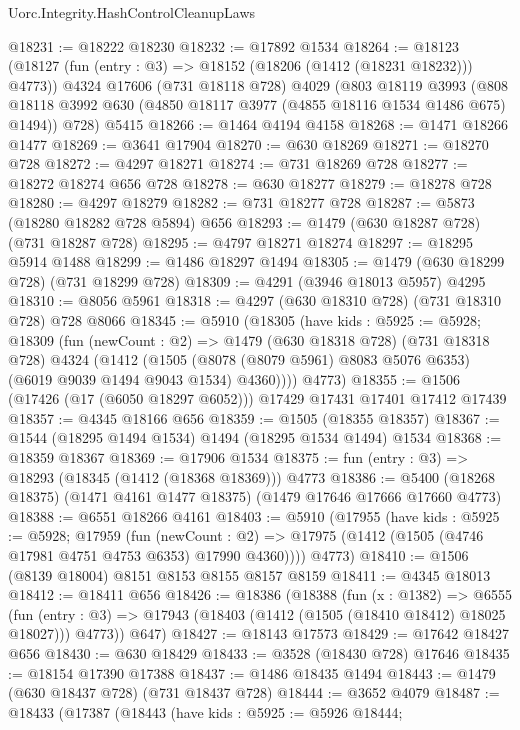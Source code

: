 \begin{lexlean}{Uorc.Integrity.HashControlCleanupLaws}
\begin{coremodule}
@18231 := @18222 @18230
@18232 := @17892 @1534
@18264 := @18123
    (@18127 (fun (entry : @3) => @18152 (@18206 (@1412 (@18231 @18232))) @4773))
    @4324
    @17606
    (@731 @18118 @728)
    @4029
    (@803
      @18119
      @3993
      (@808 @18118 @3992 @630 (@4850 @18117 @3977 (@4855 @18116 @1534 @1486 @675) @1494))
      @728)
    @5415
@18266 := @1464 @4194 @4158
@18268 := @1471 @18266 @1477
@18269 := @3641 @17904
@18270 := @630 @18269
@18271 := @18270 @728
@18272 := @4297 @18271
@18274 := @731 @18269 @728
@18277 := @18272 @18274 @656 @728
@18278 := @630 @18277
@18279 := @18278 @728
@18280 := @4297 @18279
@18282 := @731 @18277 @728
@18287 := @5873 (@18280 @18282 @728 @5894) @656
@18293 := @1479 (@630 @18287 @728) (@731 @18287 @728)
@18295 := @4797 @18271 @18274
@18297 := @18295 @5914 @1488
@18299 := @1486 @18297 @1494
@18305 := @1479 (@630 @18299 @728) (@731 @18299 @728)
@18309 := @4291 (@3946 @18013 @5957) @4295
@18310 := @8056 @5961
@18318 := @4297 (@630 @18310 @728) (@731 @18310 @728) @728 @8066
@18345 := @5910
    (@18305
      (have kids : @5925 := @5928;
      @18309
        (fun (newCount : @2) =>
        @1479
          (@630 @18318 @728)
          (@731 @18318 @728)
          @4324
          (@1412
            (@1505 (@8078 (@8079 @5961) @8083 @5076 @6353) (@6019 @9039 @1494 @9043 @1534) @4360))))
      @4773)
@18355 := @1506 (@17426 (@17 (@6050 @18297 @6052))) @17429 @17431 @17401 @17412 @17439
@18357 := @4345 @18166 @656
@18359 := @1505 (@18355 @18357)
@18367 := @1544 (@18295 @1494 @1534) @1494 (@18295 @1534 @1494) @1534
@18368 := @18359 @18367
@18369 := @17906 @1534
@18375 := fun (entry : @3) => @18293 (@18345 (@1412 (@18368 @18369))) @4773
@18386 := @5400 (@18268 @18375) (@1471 @4161 @1477 @18375) (@1479 @17646 @17666 @17660 @4773)
@18388 := @6551 @18266 @4161
@18403 := @5910
    (@17955
      (have kids : @5925 := @5928;
      @17959
        (fun (newCount : @2) =>
        @17975 (@1412 (@1505 (@4746 @17981 @4751 @4753 @6353) @17990 @4360))))
      @4773)
@18410 := @1506 (@8139 @18004) @8151 @8153 @8155 @8157 @8159
@18411 := @4345 @18013
@18412 := @18411 @656
@18426 := @18386
    (@18388
      (fun (x : @1382) =>
      @6555
        (fun (entry : @3) => @17943 (@18403 (@1412 (@1505 (@18410 @18412) @18025 @18027))) @4773))
      @647)
@18427 := @18143 @17573
@18429 := @17642 @18427 @656
@18430 := @630 @18429
@18433 := @3528 (@18430 @728) @17646
@18435 := @18154 @17390 @17388
@18437 := @1486 @18435 @1494
@18443 := @1479 (@630 @18437 @728) (@731 @18437 @728)
@18444 := @3652 @4079
@18487 := @18433
    (@17387
      (@18443
        (have kids : @5925 := @5926 @18444;

\end{coremodule}
\end{lexlean}
